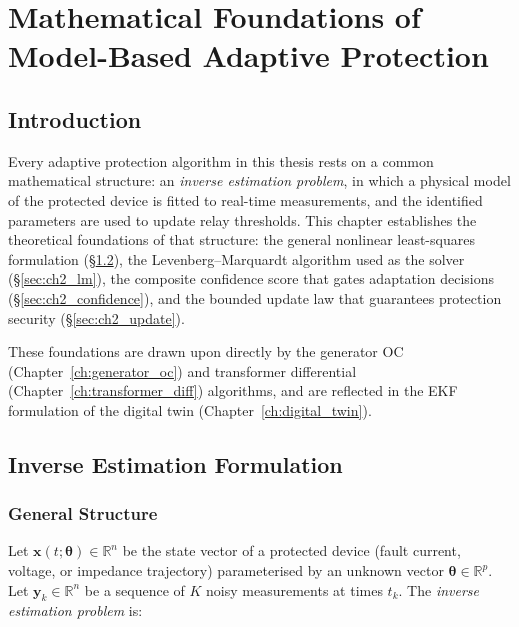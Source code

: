 \chapter{Mathematical Foundations of Model-Based Adaptive Protection}
\label{ch:foundations}

\section{Introduction}
\label{sec:ch2_intro}

Every adaptive protection algorithm in this thesis rests on a common
mathematical structure: an \emph{inverse estimation problem}, in which
a physical model of the protected device is fitted to real-time measurements,
and the identified parameters are used to update relay thresholds. This
chapter establishes the theoretical foundations of that structure:
the general nonlinear least-squares formulation (\S\ref{sec:ch2_lsq}),
the Levenberg--Marquardt algorithm used as the solver
(\S\ref{sec:ch2_lm}), the composite confidence score that gates adaptation
decisions (\S\ref{sec:ch2_confidence}), and the bounded update law that
guarantees protection security (\S\ref{sec:ch2_update}).

These foundations are drawn upon directly by the generator OC
(Chapter~\ref{ch:generator_oc}) and transformer differential
(Chapter~\ref{ch:transformer_diff}) algorithms, and are reflected in
the EKF formulation of the digital twin (Chapter~\ref{ch:digital_twin}).

\section{Inverse Estimation Formulation}
\label{sec:ch2_lsq}

\subsection{General Structure}

Let $\mathbf{x}(t; \bm{\theta}) \in \mathbb{R}^n$ be the state vector
of a protected device (fault current, voltage, or impedance trajectory)
parameterised by an unknown vector $\bm{\theta} \in \mathbb{R}^p$.
Let $\mathbf{y}_k \in \mathbb{R}^n$ be a sequence of $K$ noisy measurements
at times $t_k$. The \emph{inverse estimation problem} is:

